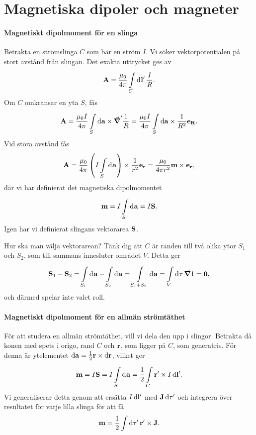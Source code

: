 \section{Magnetiska dipoler och magneter}

\paragraph{Magnetiskt dipolmoment för en slinga}
Betrakta en strömslinga $C$ som bär en ström $I$. Vi söker vektorpotentialen på stort avstånd från slingan. Det exakta uttrycket ges av
\begin{align*}
	\vb{A} = \frac{\mu_{0}}{4\pi}\int\limits_{C}^{}\dd[]{\vb{l}'}\frac{I}{R}.
\end{align*}
Om $C$ omkransar en yta $S$, fås
\begin{align*}
	\vb{A} = \frac{\mu_{0}I}{4\pi}\int\limits_{S}^{}\dd{\vb{a}}\times \grad^{\prime}{\frac{1}{R}} = \frac{\mu_{0}I}{4\pi}\int\limits_{S}^{}\dd{\vb{a}}\times \frac{1}{R^{2}}\vb{e}_{\vb{R}}.
\end{align*}
Vid stora avstånd fås
\begin{align*}
	\vb{A} = \frac{\mu_{0}}{4\pi}\left(I\int\limits_{S}^{}\dd[]{\vb{a}}\right)\times\frac{1}{r^{2}}\vb{e}_{\vb{r}} = \frac{\mu_{0}}{4\pi r^{2}}\vb{m}\times\vb{e}_{\vb{r}},
\end{align*}
där vi har definierat det magnetiska dipolmomentet
\begin{align*}
	\vb{m} = I\int\limits_{S}^{}\dd[]{\vb{a}} = I\vb{S}.
\end{align*}
Igen har vi definierat slingans vektorarea $\vb{S}$.

Hur ska man välja vektorarean? Tänk dig att $C$ är randen till två olika ytor $S_{1}$ och $S_{2}$, som till sammans innesluter området $V$. Detta ger
\begin{align*}
	\vb{S}_{1} - \vb{S}_{2} = \int\limits_{S_{1}}^{}\dd[]{\vb{a}} - \int\limits_{S_{2}}^{}\dd[]{\vb{a}} = \int\limits_{S_{1} + S_{2}}^{}\dd[]{\vb{a}} = \int\limits_{V}^{}\dd[]{\tau}\grad{1} = \vb{0},
\end{align*}
och därmed spelar inte valet roll.

\paragraph{Magnetiskt dipolmoment för en allmän strömtäthet}
För att studera en allmän strömtäthet, vill vi dela den upp i slingor. Betrakta då konen med spets i origo, rand $C$ och $\vb{r}$, som ligger på $C$, som generatris. För denna är ytelementet $\dd{\vb{a}} = \frac{1}{2}\vb{r}\times\dd{\vb{r}}$, vilket ger
\begin{align*}
	\vb{m} = I\vb{S} = I\int\limits_{S}^{}\dd[]{\vb{a}} = \frac{1}{2}\int\limits_{C}{\vb{r}'\times I\dd{\vb{l}'}}.
\end{align*}
Vi generaliserar detta genom att ersätta $I\dd{\vb{l}'}$ med $\vb{J}\dd{\tau'}$ och integrera över resultatet för varje lilla slinga för att få
\begin{align*}
	\vb{m} = \frac{1}{2}\int{\dd{\tau'}\vb{r}'\times \vb{J}}.
\end{align*}

